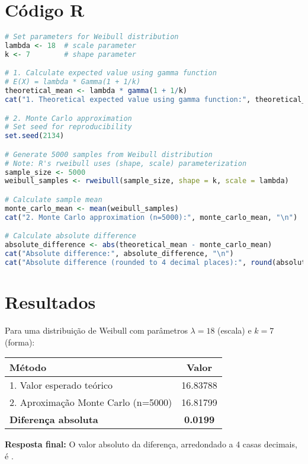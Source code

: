 \documentclass[11pt,a4paper]{article}
\begin{document}
\section*{Código R}

\begin{lstlisting}[language=R]
# Set parameters for Weibull distribution
lambda <- 18  # scale parameter
k <- 7        # shape parameter

# 1. Calculate expected value using gamma function
# E(X) = lambda * Gamma(1 + 1/k)
theoretical_mean <- lambda * gamma(1 + 1/k)
cat("1. Theoretical expected value using gamma function:", theoretical_mean, "\n")

# 2. Monte Carlo approximation
# Set seed for reproducibility
set.seed(2134)

# Generate 5000 samples from Weibull distribution
# Note: R's rweibull uses (shape, scale) parameterization
sample_size <- 5000
weibull_samples <- rweibull(sample_size, shape = k, scale = lambda)

# Calculate sample mean
monte_carlo_mean <- mean(weibull_samples)
cat("2. Monte Carlo approximation (n=5000):", monte_carlo_mean, "\n")

# Calculate absolute difference
absolute_difference <- abs(theoretical_mean - monte_carlo_mean)
cat("Absolute difference:", absolute_difference, "\n")
cat("Absolute difference (rounded to 4 decimal places):", round(absolute_difference, 4), "\n")
\end{lstlisting}

\section*{Resultados}

\begin{tcolorbox}[colback=green!5!white,colframe=green!75!black,title=Solução]
Para uma distribuição de Weibull com parâmetros $\lambda = 18$ (escala) e $k = 7$ (forma):

\begin{center}
\begin{tabular}{|l|c|}
\hline
\textbf{Método} & \textbf{Valor} \\
\hline
1. Valor esperado teórico & 16.83788 \\
2. Aproximação Monte Carlo (n=5000) & 16.81799 \\
\hline
\textbf{Diferença absoluta} & \textbf{0.0199} \\
\hline
\end{tabular}
\end{center}

\vspace{0.5cm}
\textbf{Resposta final:} O valor absoluto da diferença, arredondado a 4 casas decimais, é .
\end{tcolorbox}
\end{document}
